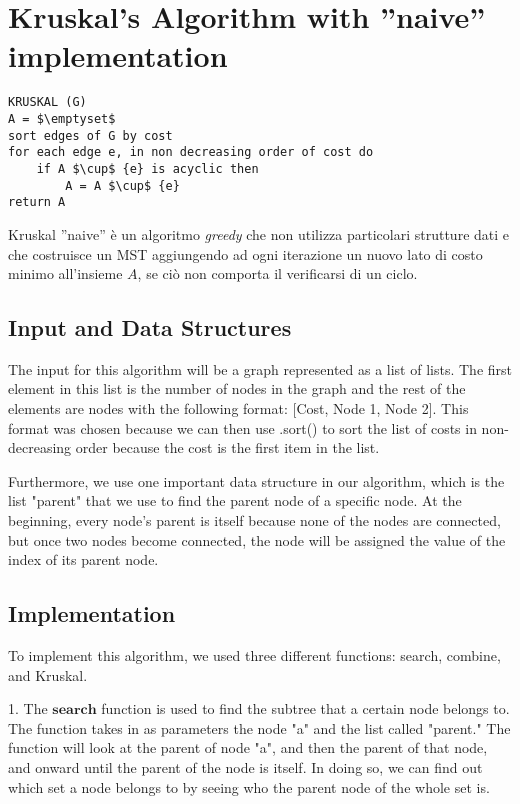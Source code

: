 \section{Kruskal's Algorithm with ''naive'' implementation}\label{kruskal_naive}

\begin{lstlisting}[mathescape=true]
KRUSKAL (G)
A = $\emptyset$
sort edges of G by cost
for each edge e, in non decreasing order of cost do
	if A $\cup$ {e} is acyclic then
		A = A $\cup$ {e}
return A	
\end{lstlisting}

Kruskal ''naive'' è un algoritmo \textit{greedy} che non utilizza particolari strutture dati e che costruisce un MST aggiungendo ad ogni iterazione un nuovo lato di costo minimo all'insieme $A$, se ciò non comporta il verificarsi di un ciclo.

\subsection{Input and Data Structures}

The input for this algorithm will be a graph represented as a list of lists. The first element in this list is the number of nodes in the graph and the rest of the elements are nodes with the following format: [Cost, Node 1, Node 2]. This format was chosen because we can then use .sort() to sort the list of costs in non-decreasing order because the cost is the first item in the list. 

Furthermore, we use one important data structure in our algorithm, which is the list "parent" that we use to find the parent node of a specific node. At the beginning, every node's parent is itself because none of the nodes are connected, but once two nodes become connected, the node will be assigned the value of the index of its parent node. 


\subsection{Implementation}
To implement this algorithm, we used three different functions: search, combine, and Kruskal.

1. The $\textbf{search}$ function is used to find the subtree that a certain node belongs to. The function takes in as parameters the node "a" and the list called "parent." The function will look at the parent of node "a", and then the parent of that node, and onward until the parent of the node is itself. In doing so, we can find out which set a node belongs to by seeing who the parent node of the whole set is.

